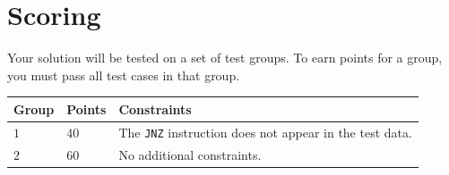 \section*{Scoring}
Your solution will be tested on a set of test groups.
To earn points for a group, you must pass all test cases in that group.


\noindent
\begin{tabular}{| l | l | p{12cm} |}
  \hline
  \textbf{Group} & \textbf{Points} & \textbf{Constraints} \\ \hline
  $1$    & $40$       & The \texttt{JNZ} instruction does not appear in the test data. \\ \hline
  $2$    & $60$       & No additional constraints. \\ \hline
\end{tabular}
